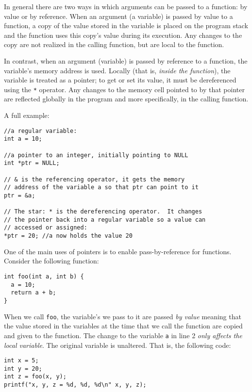 \documentclass[12pt]{scrartcl}
\begin{document}
In general there are two ways in which arguments can be passed to 
a function: by value or by reference. When an argument (a variable) 
is passed by value to a function, a copy of the value stored in the 
variable is placed on the program stack and the function uses this 
copy's value during its execution.  Any changes to the copy are not 
realized in the calling function, but are local to the function.

In contrast, when an argument (variable) is passed by reference to a 
function, the variable's memory address is used.  Locally (that is, 
\emph{inside the function}), the variable 
is treated as a pointer; to get or set its value, it must be dereferenced 
using the \texttt{*} operator.  Any changes to the memory cell pointed to by 
that pointer are reflected globally in the program and more specifically, 
in the calling function.

A full example:

\begin{verbatim}
//a regular variable:
int a = 10; 

//a pointer to an integer, initially pointing to NULL
int *ptr = NULL; 

// & is the referencing operator, it gets the memory 
// address of the variable a so that ptr can point to it
ptr = &a; 

// The star: * is the dereferencing operator.  It changes 
// the pointer back into a regular variable so a value can 
// accessed or assigned:
*ptr = 20; //a now holds the value 20
\end{verbatim}

One of the main uses of pointers is to enable pass-by-reference 
for functions.  Consider the following function:

\begin{verbatim}
int foo(int a, int b) {
  a = 10;
  return a + b;
}
\end{verbatim}

When we call \texttt{foo}, the variable's we pass to it are passed
\emph{by value} meaning that the value stored in the variables at the
time that we call the function are copied and given to the function.  The
change to the variable \texttt{a} in line 2 \emph{only affects
the local variable}.  The original variable is unaltered.  That is, the following
code:

\begin{verbatim}
int x = 5;
int y = 20;
int z = foo(x, y);
printf("x, y, z = %d, %d, %d\n" x, y, z);
\end{verbatim}
\end{document}
